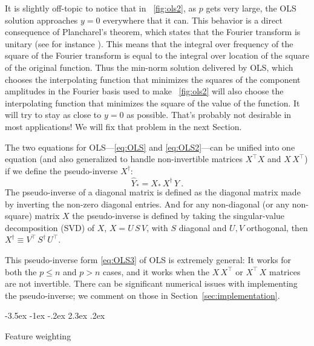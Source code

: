 \documentclass[12pt,letterpaper]{article}
\makeatletter
\renewcommand\section{\@startsection {section}{1}{\z@}%
  {-3.5ex \@plus -1ex \@minus -.2ex}%
  {2.3ex \@plus.2ex}%
  {\raggedright\normalfont\Large\bfseries}}
\newcommand{\sectionname}{Section}
\makeatother
\begin{document}
It is slightly off-topic to notice that in \figurename~\ref{fig:ols2}, as $p$ gets very large, the OLS solution approaches $y=0$ everywhere that it can.
This behavior is a direct consequence of Plancharel's theorem, which states that the Fourier transform is unitary (see for instance \citealt{folland2016course}).
This means that the integral over frequency of the square of the Fourier transform is equal to the integral over location of the square of the original function.
Thus the min-norm solution delivered by OLS, which chooses the interpolating function that minimizes the squares of the component amplitudes in the Fourier basis used to make \figurename~\ref{fig:ols2} will also choose the interpolating function that minimizes the square of the value of the function.
It will try to stay as close to $y=0$ as possible.
That's probably not desirable in most applications! We will fix that problem in the next \sectionname.

The two equations for OLS---\eqref{eq:OLS} and \eqref{eq:OLS2}---can be unified into one equation (and also generalized to handle non-invertible matrices $X^\top X$ and $X\,X^\top$) if we define the pseudo-inverse $X^\dagger$:
\begin{equation}\label{eq:OLS3}
    \hat{Y}_\ast = X_\ast\,X^\dagger\,Y
    ~.
\end{equation}
The pseudo-inverse of a diagonal matrix is defined as the diagonal matrix made by inverting the non-zero diagonal entries. And for any non-diagonal (or any non-square) matrix $X$ the pseudo-inverse is defined by taking the singular-value decomposition (SVD) of $X$, $X=U\,S\,V$, with $S$ diagonal and $U,V$ orthogonal, then $X^\dagger \equiv V^\top\,S^\dagger\,U^\top$.

This pseudo-inverse form \eqref{eq:OLS3} of OLS is extremely general: It works for both the $p\le n$ and $p>n$ cases, and it works when the $X\,X^\top$ or $X^\top\,X$ matrices are not invertible.
There can be significant numerical issues with implementing the pseudo-inverse; we comment on those in \sectionname~\ref{sec:implementation}.

\section{Feature weighting}\label{sec:fwols}
\end{document}

